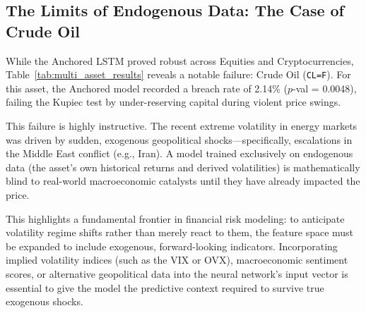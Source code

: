 \subsection{The Limits of Endogenous Data: The Case of Crude Oil}

While the Anchored LSTM proved robust across Equities and Cryptocurrencies, Table~\ref{tab:multi_asset_results} reveals a notable failure: Crude Oil (\texttt{CL=F}). For this asset, the Anchored model recorded a breach rate of 2.14\% ($p$-val = 0.0048), failing the Kupiec test by under-reserving capital during violent price swings.

This failure is highly instructive. The recent extreme volatility in energy markets was driven by sudden, exogenous geopolitical shocks---specifically, escalations in the Middle East conflict (e.g., Iran). A model trained exclusively on endogenous data (the asset's own historical returns and derived volatilities) is mathematically blind to real-world macroeconomic catalysts until they have already impacted the price. 

This highlights a fundamental frontier in financial risk modeling: to anticipate volatility regime shifts rather than merely react to them, the feature space must be expanded to include exogenous, forward-looking indicators. Incorporating implied volatility indices (such as the VIX or OVX), macroeconomic sentiment scores, or alternative geopolitical data into the neural network's input vector is essential to give the model the predictive context required to survive true exogenous shocks.